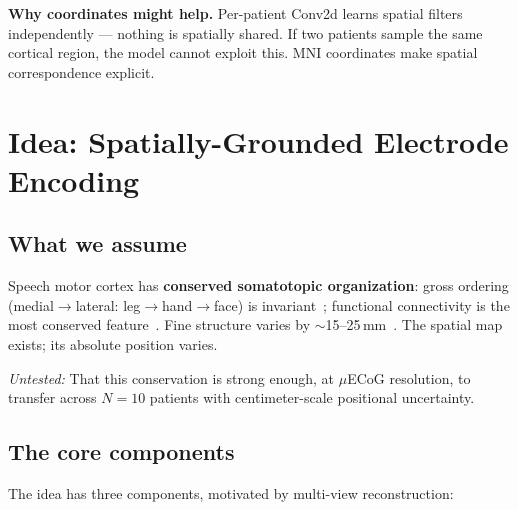 \documentclass[11pt,letterpaper]{article}
\begin{document}
\textbf{Why coordinates might help.} Per-patient Conv2d learns spatial filters independently --- nothing is spatially shared. If two patients sample the same cortical region, the model cannot exploit this. MNI coordinates make spatial correspondence explicit.



\section{Idea: Spatially-Grounded Electrode Encoding}\label{sec:idea}

\subsection{What we assume}

Speech motor cortex has \textbf{conserved somatotopic organization}: gross ordering (medial$\to$lateral: leg$\to$hand$\to$face) is invariant~\cite{roux2020}; functional connectivity is the most conserved feature~\cite{mueller2013}. Fine structure varies by ${\sim}$15--25\,mm~\cite{eichert2020}. The spatial map exists; its absolute position varies.

\textcolor{BrickRed}{\textit{Untested:}} That this conservation is strong enough, at $\mu$ECoG resolution, to transfer across $N{=}10$ patients with centimeter-scale positional uncertainty.

\subsection{The core components}\label{sec:components}

The idea has three components, motivated by multi-view reconstruction:
\end{document}
